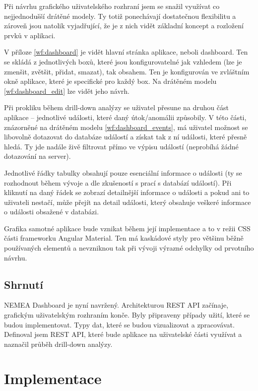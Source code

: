 
Při návrhu grafického uživatelského rozhraní jsem se snažil využívat co nejjednodušší drátěné modely. Ty totiž ponechávají dostatečnou flexibilitu a zároveň jsou natolik vyjadřující, že je z nich vidět základní koncept a rozložení prvků v aplikaci.

V příloze \ref{wf:dashboard} je vidět hlavní stránka aplikace, neboli dashboard. Ten se skládá z jednotlivých boxů, které jsou konfigurovatelné jak vzhledem (lze je zmenšit, zvětšit, přidat, smazat), tak obsahem. Ten je konfigurován ve zvláštním okně aplikace, které je specifické pro každý box. Na drátěném modelu \ref{wf:dashboard_edit} lze vidět jeho návrh.

Při prokliku během drill-down analýzy se uživatel přesune na druhou část aplikace -- jednotlivé události, které daný útok/anomálii způsobily. V této části, znázorněné na drátěném modelu \ref{wf:dashboard_events}, má uživatel možnost se libovolně dotazovat do databáze událostí a získat tak z ní události, které přesně hledá. Ty jde nadále živě filtrovat přímo ve výpisu událostí (neprobíhá žádné dotazování na server).

Jednotlivé řádky tabulky obsahují pouze esenciální informace o události (ty se rozhodnout během vývoje a dle zkušeností s prací s databází událostí). Při kliknutí na daný řádek se zobrazí detailnější informace o události a pokud ani to uživateli nestačí, může přejít na detail události, který obsahuje veškeré informace o události obsažené v databázi.

Grafika samotné aplikace bude vznikat během její implementace a to v režii CSS části frameworku Angular Material. Ten má kaskádové styly pro většinu běžně používaných elementů a nevzniknou tak při vývoji výrazné odchylky od prvotního návrhu.

\section{Shrnutí}

NEMEA Dashboard je nyní navržený. Architekturou REST API začínaje, grafickým uživatelským rozhraním konče. Byly připraveny případy užití, které se budou implementovat. Typy dat, které se budou vizualizovat a zpracovávat. Definoval jsem REST API, které bude aplikace na uživatelské části využívat a naznačil průběh drill-down analýzy.

\chapter{Implementace}

